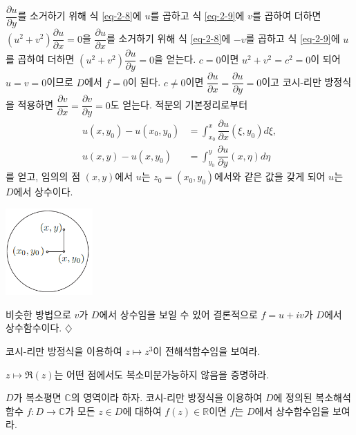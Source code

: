 \begin{saltexample}{}{}
$\dfrac{\partial u}{\partial y}$를 소거하기 위해 식 \eqref{eq-2-8}에 $u$를 곱하고
식 \eqref{eq-2-9}에 $v$를 곱하여 더하면
$(u^2+v^2)\dfrac{\partial u}{\partial x}  = 0$을
$\dfrac{\partial u}{\partial x}$를 소거하기 위해 식 \eqref{eq-2-8}에 $-v$를 곱하고
식 \eqref{eq-2-9}에 $u$를 곱하여 더하면
$(u^2+v^2)\dfrac{\partial u}{\partial y}  = 0$을 얻는다.
$c=0$이면  $u^2+v^2=c^2=0$이 되어 $u=v=0$이므로 $D$에서 $f=0$이 된다.
$c\ne0$이면 $\dfrac{\partial u}{\partial x}= \dfrac{\partial u}{\partial y}=0$이고
코시-리만 방정식을 적용하면 
$\dfrac{\partial v}{\partial x}= \dfrac{\partial v}{\partial y}=0$도 얻는다.
적분의 기본정리로부터 
\begin{align*}
u(x,y_0) - u(x_0, y_0) &= \int_{x_0}^x \dfrac{\partial u}{\partial x}(\xi, y_0)d\xi, \\
u(x,y) - u(x, y_0) &= \int_{y_0}^y \dfrac{\partial u}{\partial y}(x, \eta)d\eta
\end{align*}
를 얻고, 임의의 점 $(x,y)$에서 $u$는 $z_0 = (x_0,y_0)$에서와 같은 값을 갖게 되어
 $u$는 $D$에서 상수이다.

\begin{center}
\includegraphics[width=0.25\textwidth]{./SaltChapter/fig-2-0-3}
\end{center}

비슷한 방법으로 $v$가 $D$에서 상수임을 보일 수 있어
결론적으로 $f=u+iv$가 $D$에서 상수함수이다.
\hfill $\diamondsuit$
\end{saltexample}

\begin{salt_exercise} \label{ex-2-10}
코시-리만 방정식을 이용하여 $z\mapsto z^3$이 전해석함수임을 보여라.
\end{salt_exercise}

\begin{salt_exercise} \label{ex-2-11}
$z\mapsto \Re(z)$는 어떤 점에서도 복소미분가능하지 않음을 증명하라.
\end{salt_exercise}

\begin{salt_exercise} \label{ex-2-12}
$D$가 복소평면 $\mathbb C$의 영역이라 하자.
코시-리만 방정식을 이용하여 
$D$에 정의된 복소해석함수 $f:D\to\mathbb C$가 
모든  $z\in D$에 대하여 $f(z)\in\mathbb R$이면
$f$는 $D$에서 상수함수임을 보여라.
\end{salt_exercise}

